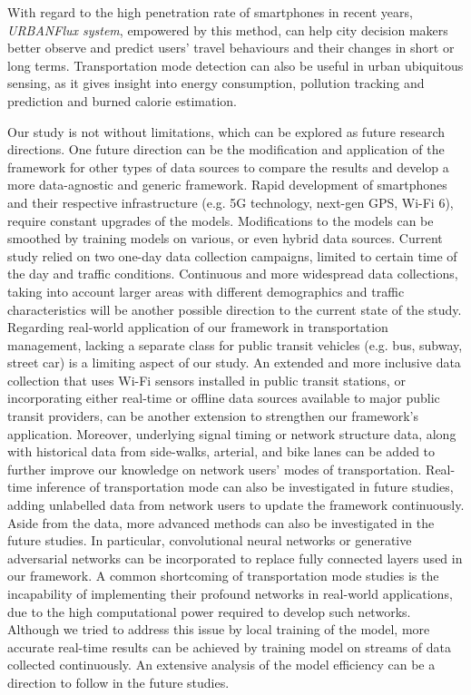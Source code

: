 With regard to the high penetration rate of smartphones in recent years, \emph{URBANFlux system}, empowered by this method, can help city decision makers better observe and predict users' travel behaviours and their changes in short or long terms.  Transportation mode detection can also be useful in urban ubiquitous sensing, as it gives insight into energy consumption, pollution tracking and prediction and burned calorie estimation.

Our study is not without limitations, which can be explored as future research directions. One future direction can be the modification and application of the framework for other types of data sources to compare the results and develop a more data-agnostic and generic framework. Rapid development of smartphones and their respective infrastructure (e.g. 5G technology, next-gen GPS, Wi-Fi 6), require constant upgrades of the models. Modifications to the models can be smoothed by training models on various, or even hybrid data sources. Current study relied on two one-day data collection campaigns, limited to certain time of the day and traffic conditions. Continuous and more widespread data collections, taking into account larger areas with different demographics and traffic characteristics will be another possible direction to the current state of the study. Regarding real-world application of our framework in transportation management, lacking a separate class for public transit vehicles (e.g. bus, subway, street car) is a limiting aspect of our study. An extended and more inclusive data collection that uses Wi-Fi sensors installed in public transit stations, or incorporating either real-time or offline data sources available to major public transit providers, can be another extension to strengthen our framework's application. Moreover, underlying signal timing or network structure data, along with historical data from side-walks, arterial, and bike lanes can be added to further improve our knowledge on network users' modes of transportation. Real-time inference of transportation mode can also be investigated in future studies, adding unlabelled data from network users to update the framework continuously. Aside from the data, more advanced methods can also be investigated in the future studies. In particular, convolutional neural networks or generative adversarial networks can be incorporated to replace fully connected layers used in our framework. A common shortcoming of transportation mode studies is the incapability of implementing their profound networks in real-world applications, due to the high computational power required to develop such networks. Although we tried to address this issue by local training of the model, more accurate real-time results can be achieved by training model on streams of data collected continuously. An extensive analysis of the model efficiency can be a direction to follow in the future studies. \\ 